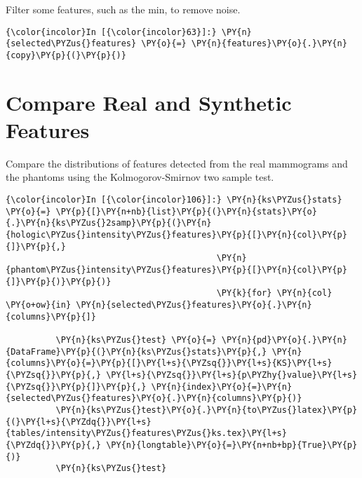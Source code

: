     Filter some features, such as the min, to remove noise.

    \begin{Verbatim}[commandchars=\\\{\}]
{\color{incolor}In [{\color{incolor}63}]:} \PY{n}{selected\PYZus{}features} \PY{o}{=} \PY{n}{features}\PY{o}{.}\PY{n}{copy}\PY{p}{(}\PY{p}{)}
\end{Verbatim}

    \section{Compare Real and Synthetic
Features}\label{compare-real-and-synthetic-features}

    Compare the distributions of features detected from the real mammograms
and the phantoms using the Kolmogorov-Smirnov two sample test.

    \begin{Verbatim}[commandchars=\\\{\}]
{\color{incolor}In [{\color{incolor}106}]:} \PY{n}{ks\PYZus{}stats} \PY{o}{=} \PY{p}{[}\PY{n+nb}{list}\PY{p}{(}\PY{n}{stats}\PY{o}{.}\PY{n}{ks\PYZus{}2samp}\PY{p}{(}\PY{n}{hologic\PYZus{}intensity\PYZus{}features}\PY{p}{[}\PY{n}{col}\PY{p}{]}\PY{p}{,}
                                          \PY{n}{phantom\PYZus{}intensity\PYZus{}features}\PY{p}{[}\PY{n}{col}\PY{p}{]}\PY{p}{)}\PY{p}{)}
                                          \PY{k}{for} \PY{n}{col} \PY{o+ow}{in} \PY{n}{selected\PYZus{}features}\PY{o}{.}\PY{n}{columns}\PY{p}{]}

          \PY{n}{ks\PYZus{}test} \PY{o}{=} \PY{n}{pd}\PY{o}{.}\PY{n}{DataFrame}\PY{p}{(}\PY{n}{ks\PYZus{}stats}\PY{p}{,} \PY{n}{columns}\PY{o}{=}\PY{p}{[}\PY{l+s}{\PYZsq{}}\PY{l+s}{KS}\PY{l+s}{\PYZsq{}}\PY{p}{,} \PY{l+s}{\PYZsq{}}\PY{l+s}{p\PYZhy{}value}\PY{l+s}{\PYZsq{}}\PY{p}{]}\PY{p}{,} \PY{n}{index}\PY{o}{=}\PY{n}{selected\PYZus{}features}\PY{o}{.}\PY{n}{columns}\PY{p}{)}
          \PY{n}{ks\PYZus{}test}\PY{o}{.}\PY{n}{to\PYZus{}latex}\PY{p}{(}\PY{l+s}{\PYZdq{}}\PY{l+s}{tables/intensity\PYZus{}features\PYZus{}ks.tex}\PY{l+s}{\PYZdq{}}\PY{p}{,} \PY{n}{longtable}\PY{o}{=}\PY{n+nb+bp}{True}\PY{p}{)}
          \PY{n}{ks\PYZus{}test}
\end{Verbatim}

